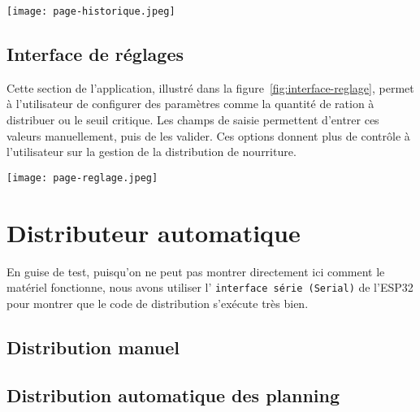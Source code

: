 \begin{minipage}{\linewidth}
  \centering
  \texttt{[image: page-historique.jpeg]}
  \label{fig:interface-historique}
\end{minipage}

\subsection{Interface de réglages}
Cette section de l’application, illustré dans la figure~\ref{fig:interface-reglage}, permet à l’utilisateur de configurer des paramètres comme la quantité de ration à distribuer ou le seuil critique. Les champs de saisie permettent d’entrer ces valeurs manuellement, puis de les valider. Ces options donnent plus de contrôle à l'utilisateur sur la gestion de la distribution de nourriture.

\begin{minipage}{\linewidth}
  \centering
  \texttt{[image: page-reglage.jpeg]}
  \label{fig:interface-reglage}
\end{minipage}

\section{Distributeur automatique}
En guise de test, puisqu'on ne peut pas montrer directement ici comment le matériel fonctionne, nous avons utiliser l' \verb|interface série (Serial)| de l'ESP32 pour montrer que le code de distribution s'exécute très bien.
\subsection{Distribution manuel}
\subsection{Distribution automatique des planning}